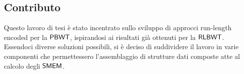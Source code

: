 \documentclass[a4paper,11pt, oneside,italian]{article}
\def\RLBWT{\mbox{\rm {\sf RLBWT}}}
\def\PBWT{\mbox{\rm {\sf PBWT}}}
\def\SMEM{\mbox{\rm {\sf SMEM}}}
\begin{document}
\subsection*{Contributo}


Questo lavoro di tesi è stato incentrato sullo sviluppo di approcci run-length
encoded per la $\PBWT$, ispirandosi ai risultati già ottenuti per la $\RLBWT$.
Essendoci diverse soluzioni
possibili, si è deciso di suddividere il lavoro in varie componenti che
permettessero l'assemblaggio di strutture dati composte atte al calcolo degli
$\SMEM$.  
\end{document}
